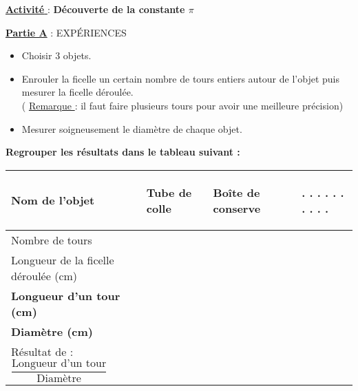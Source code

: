 \documentclass[a4paper,11pt]{article}
\newcommand{\bi}{\begin{itemize}}
\newcommand{\ei}{\end{itemize}}
\begin{document}
\begin{center}
\underline{{\Large \textbf{Activité}  }}: {\large\textbf{ Découverte de la constante $\pi$}}
\end{center}

\vspace*{1cm}

{\large \textbf{\underline{Partie A}} : EXPÉRIENCES }\\

\bi

\item Choisir 3 objets.\\

\item Enrouler la ficelle un certain nombre de tours entiers autour de l'objet puis mesurer la ficelle déroulée.\\
( \underline{Remarque }: il faut faire plusieurs tours pour avoir une meilleure précision)  \\

\item Mesurer soigneusement le diamètre de chaque objet.\\


\ei

\textbf{Regrouper les résultats dans le tableau suivant : }

\renewcommand{\arraystretch}{2.2}

\begin{flushleft}
\begin{tabular}{|m{7cm}|m{3.5cm}|m{3.5cm}|m{3.5cm}|}
\hline 
\begin{center}
 \textbf{Nom de l'objet}
 \end{center} & \begin{center}
 Tube de colle
 \end{center}  & \begin{center}
 Boîte de conserve
 \end{center} &  \begin{center}
 . . . . . . . . . .
 \end{center}   \\ 
\hline 
Nombre de tours&  &  &     \\ 
\hline 
Longueur de la ficelle déroulée (cm) &  &   &    \\ 
\hline 
\textbf{Longueur d'un tour (cm)}&  &  &    \\ 
\hline 
\textbf{Diamètre (cm)} &  &  &     \\ 
\hline
Résultat de : \hspace*{0.75cm}$\dfrac{\text{Longueur d'un tour}}{\text{Diamètre}}$ &  &  &     \\ 
\hline
\end{tabular} 
\end{flushleft}
\vspace*{0.5cm}
\end{document}
